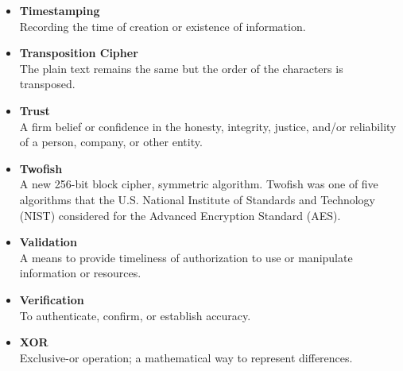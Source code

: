 \begin{itemize}
\item \textbf{Timestamping}\\
Recording the time of creation or existence of information.

\item \textbf{Transposition Cipher}\\
The plain text remains the same but the order of the characters is transposed.

\item \textbf{Trust}\\
A firm belief or confidence in the honesty, integrity, justice, and/or reliability of a person, company, or other entity.

\item \textbf{Twofish}\\
A new 256-bit block cipher, symmetric algorithm. Twofish was one of five algorithms that the U.S. National Institute of Standards and Technology (NIST) considered for the Advanced Encryption Standard (AES).

\item \textbf{Validation}\\
A means to provide timeliness of authorization to use or manipulate information or resources.

\item \textbf{Verification}\\
To authenticate, confirm, or establish accuracy.

\item \textbf{XOR}\\
Exclusive-or operation; a mathematical way to represent differences.

\end{itemize}




